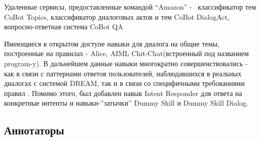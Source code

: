 Удаленные сервисы, предоставленные командой “Amazon” -  классификатор тем CoBot Topics, классификатор диалоговых актов и тем CoBot DialogAct, вопросно-ответная система CoBot QA

Имеющиеся в открытом доступе навыки для диалога на общие темы, построенные на правилах - Alice, AIML Chit-Chat(встроенный под названием program-y). В дальнейшем данные навыки многократно совершенствовались - как в связи с паттернами ответов пользователей, наблюдавшихся в реальных диалогах с системой DREAM, так и в связи со специфичными требованиями правил \cite{na_website_ndg}. Помимо этого, был добавлен навык Intent Responder для ответа на конкретные интенты и навыки-”затычки” Dummy Skill и Dummy Skill Dialog.

\subsection{Аннотаторы}


